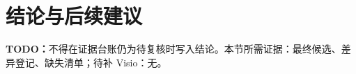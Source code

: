 \chapter{结论与后续建议}\label{chap:conclusion}
\textbf{TODO：}不得在证据台账仍为待复核时写入结论。本节所需证据：最终候选、差异登记、缺失清单；待补 Visio：无。
